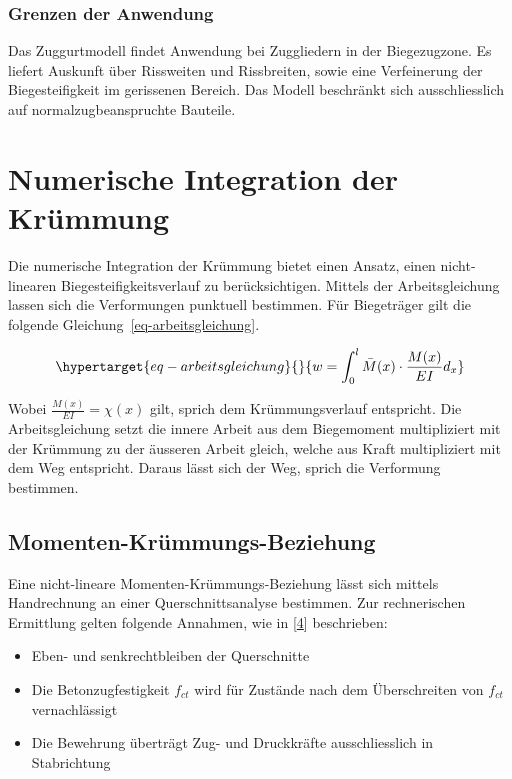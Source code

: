 \documentclass[
  12pt,
  letterpaper,
  egregdoesnotlikesansseriftitles]{scrreprt}
\providecommand{\tightlist}{%
  \setlength{\itemsep}{0pt}\setlength{\parskip}{0pt}}\usepackage{longtable,booktabs,array}
\begin{document}
\hypertarget{grenzen-der-anwendung-1}{%
\subsubsection{Grenzen der Anwendung}\label{grenzen-der-anwendung-1}}

Das Zuggurtmodell findet Anwendung bei Zuggliedern in der Biegezugzone.
Es liefert Auskunft über Rissweiten und Rissbreiten, sowie eine
Verfeinerung der Biegesteifigkeit im gerissenen Bereich. Das Modell
beschränkt sich ausschliesslich auf normalzugbeanspruchte Bauteile.

\hypertarget{sec-numint}{%
\section{Numerische Integration der Krümmung}\label{sec-numint}}

Die numerische Integration der Krümmung bietet einen Ansatz, einen
nicht-linearen Biegesteifigkeitsverlauf zu berücksichtigen. Mittels der
Arbeitsgleichung lassen sich die Verformungen punktuell bestimmen. Für
Biegeträger gilt die folgende Gleichung~\ref{eq-arbeitsgleichung}.

\begin{equation}\protect\hypertarget{eq-arbeitsgleichung}{}{
w = \int_0^l \bar{M}(x) \cdot \frac{M(x)}{EI} d_x
}\label{eq-arbeitsgleichung}\end{equation}

Wobei \(\frac{M(x)}{EI} = \chi(x)\) gilt, sprich dem Krümmungsverlauf
entspricht. Die Arbeitsgleichung setzt die innere Arbeit aus dem
Biegemoment multipliziert mit der Krümmung zu der äusseren Arbeit
gleich, welche aus Kraft multipliziert mit dem Weg entspricht. Daraus
lässt sich der Weg, sprich die Verformung bestimmen.

\hypertarget{momenten-kruxfcmmungs-beziehung}{%
\subsection{Momenten-Krümmungs-Beziehung}\label{momenten-kruxfcmmungs-beziehung}}

Eine nicht-lineare Momenten-Krümmungs-Beziehung lässt sich mittels
Handrechnung an einer Querschnittsanalyse bestimmen. Zur rechnerischen
Ermittlung gelten folgende Annahmen, wie in
{[}\protect\hyperlink{ref-Spathelf2022}{4}{]} beschrieben:

\begin{itemize}
\tightlist
\item
  Eben- und senkrechtbleiben der Querschnitte
\item
  Die Betonzugfestigkeit \(f_{ct}\) wird für Zustände nach dem
  Überschreiten von \(f_{ct}\) vernachlässigt
\item
  Die Bewehrung überträgt Zug- und Druckkräfte ausschliesslich in
  Stabrichtung
\end{itemize}
\end{document}
